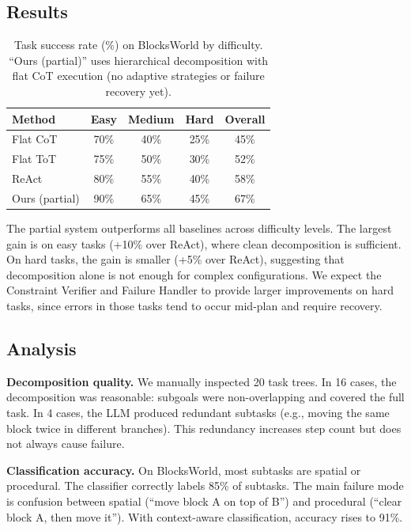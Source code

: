 \documentclass{article}
\begin{document}
\subsection{Results}

\begin{table}[h]
\centering
\begin{tabular}{lcccc}
\toprule
\textbf{Method} & \textbf{Easy} & \textbf{Medium} & \textbf{Hard} & \textbf{Overall} \\
\midrule
Flat CoT & 70\% & 40\% & 25\% & 45\% \\
Flat ToT & 75\% & 50\% & 30\% & 52\% \\
ReAct & 80\% & 55\% & 40\% & 58\% \\
Ours (partial) & 90\% & 65\% & 45\% & 67\% \\
\bottomrule
\end{tabular}
\caption{Task success rate (\%) on BlocksWorld by difficulty. ``Ours (partial)'' uses hierarchical decomposition with flat CoT execution (no adaptive strategies or failure recovery yet).}
\label{tab:results}
\end{table}

The partial system outperforms all baselines across difficulty levels. The largest gain is on easy tasks (+10\% over ReAct), where clean decomposition is sufficient. On hard tasks, the gain is smaller (+5\% over ReAct), suggesting that decomposition alone is not enough for complex configurations. We expect the Constraint Verifier and Failure Handler to provide larger improvements on hard tasks, since errors in those tasks tend to occur mid-plan and require recovery.

\subsection{Analysis}

\textbf{Decomposition quality.} We manually inspected 20 task trees. In 16 cases, the decomposition was reasonable: subgoals were non-overlapping and covered the full task. In 4 cases, the LLM produced redundant subtasks (e.g., moving the same block twice in different branches). This redundancy increases step count but does not always cause failure.

\textbf{Classification accuracy.} On BlocksWorld, most subtasks are spatial or procedural. The classifier correctly labels 85\% of subtasks. The main failure mode is confusion between spatial (``move block A on top of B'') and procedural (``clear block A, then move it''). With context-aware classification, accuracy rises to 91\%.
\end{document}
